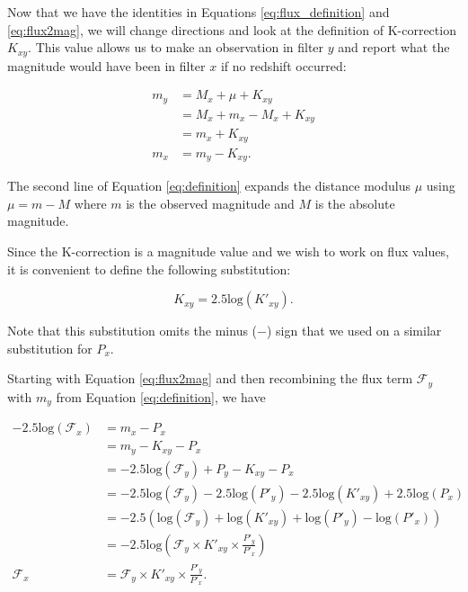 \documentclass[linenumbers]{aastex631}
\begin{document}
Now that we have the identities in Equations \ref{eq:flux_definition} and
\ref{eq:flux2mag}, we will change directions and look at the definition of
K-correction $K_{xy}$. This value allows us to make an observation in filter
$y$ and report what the magnitude would have been in filter $x$ if no redshift
occurred:

\begin{equation}
\begin{aligned}
\label{eq:definition}
  m_y &= M_x + \mu + K_{xy} \\
      &= M_x + m_x - M_x + K_{xy} \\
      &= m_x + K_{xy} \\
  m_x &= m_y - K_{xy} .
\end{aligned}
\end{equation}

\noindent The second line of Equation \ref{eq:definition} expands the distance modulus
$\mu$ using $\mu = m - M$ where $m$ is the observed magnitude and $M$ is the
absolute magnitude.

Since the K-correction is a magnitude value and we wish to work on flux values,
it is convenient to define the following substitution:

\begin{equation}
\label{eq:k_substitution}
  K_{xy} = 2.5\text{log}(K'_{xy}) .
\end{equation}

\noindent Note that this substitution omits the minus ($-$) sign that we used on a
similar substitution for $P_x$.

Starting with Equation \ref{eq:flux2mag} and then
recombining the flux term $\mathcal{F}_y$ with $m_y$ from Equation
\ref{eq:definition}, we have

\begin{equation}
\begin{aligned}
\label{eq:as_flux}
  -2.5 \text{log}(\mathcal{F}_x)
      &= m_x - P_x \\
      &= m_y - K_{xy} - P_x \\
      &= -2.5 \text{log}(\mathcal{F}_y) + P_y - K_{xy} - P_x \\
      &= -2.5 \text{log}(\mathcal{F}_y)
         - 2.5 \text{log}(P'_y)
         - 2.5 \text{log}(K'_{xy})
         + 2.5 \text{log}(P_x) \\
      &= -2.5 \left(
         \text{log}(\mathcal{F}_y)
         + \text{log}(K'_{xy})
         + \text{log}(P'_y)
         - \text{log}(P'_x)
        \right) \\
      &= -2.5 \text{log}\left(
        \mathcal{F}_y
        \times K'_{xy}
        \times \frac{P'_y}{P'_x}\right) \\
  \mathcal{F}_x &= \mathcal{F}_y \times K'_{xy} \times \frac{P'_y}{P'_x}.
\end{aligned}
\end{equation}
\end{document}
